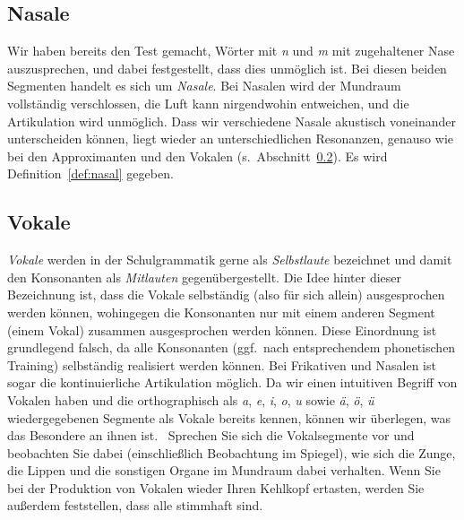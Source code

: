 \subsection{Nasale}
\label{sec:nasale}

Wir haben bereits den Test gemacht, Wörter mit \textit{n} und \textit{m} mit zugehaltener Nase auszusprechen, und dabei festgestellt, dass dies unmöglich ist.
Bei diesen beiden Segmenten handelt es sich um \textit{Nasale}.
Bei Nasalen wird der Mundraum vollständig verschlossen, die Luft kann nirgendwohin entweichen, und die Artikulation wird unmöglich.
Dass wir verschiedene Nasale akustisch voneinander unterscheiden können, liegt wieder an unterschiedlichen Resonanzen, genauso wie bei den Approximanten und den Vokalen (s.\ Abschnitt~\ref{sec:vokale}).
Es wird Definition~\ref{def:nasal} gegeben.


\subsection{Vokale}
\label{sec:vokale}

\textit{Vokale} werden in der Schulgrammatik gerne als \textit{Selbstlaute} bezeichnet und damit den Konsonanten als \textit{Mitlauten} gegenübergestellt.
Die Idee hinter dieser Bezeichnung ist, dass die Vokale selbständig (also für sich allein) ausgesprochen werden können, wohingegen die Konsonanten nur mit einem anderen Segment (einem Vokal) zusammen ausgesprochen werden können.
Diese Einordnung ist grundlegend falsch, da alle Konsonanten (ggf.\ nach entsprechendem phonetischen Training) selbständig realisiert werden können.
Bei Frikativen und Nasalen ist sogar die kontinuierliche Artikulation möglich.
Da wir einen intuitiven Begriff von Vokalen haben und die orthographisch als \textit{a}, \textit{e}, \textit{i}, \textit{o}, \textit{u} sowie \textit{ä}, \textit{ö}, \textit{ü} wiedergegebenen Segmente als Vokale bereits kennen, können wir überlegen, was das Besondere an ihnen ist.
\TuBegin~Sprechen Sie sich die Vokalsegmente vor und beobachten Sie dabei (einschließlich Beobachtung im Spiegel), wie sich die Zunge, die Lippen und die sonstigen Organe im Mundraum dabei verhalten. Wenn Sie bei der Produktion von Vokalen wieder Ihren Kehlkopf ertasten, werden Sie außerdem feststellen, dass alle stimmhaft sind.

